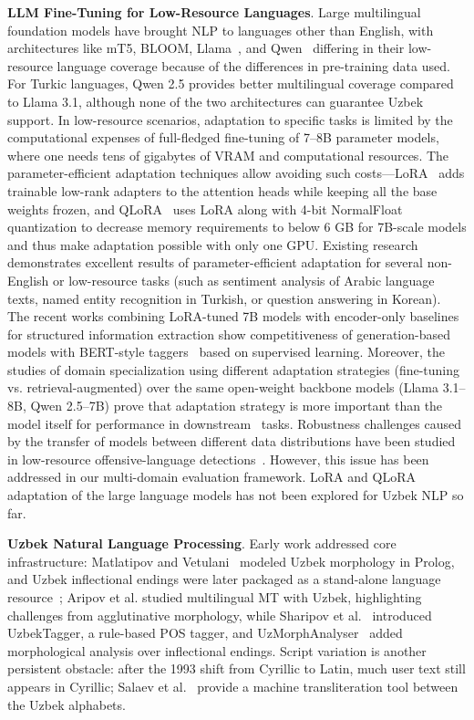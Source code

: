 \documentclass[bdcc,article,submit,moreauthors]{Definitions/mdpi}
\begin{document}
\textbf{LLM Fine-Tuning for Low-Resource Languages}. Large multilingual foundation models have brought NLP to languages other than English, with architectures like mT5, BLOOM, Llama~\cite{Touvron2023-lf,Grattafiori2024-ka}, and Qwen~\cite{Qwen2024-kr} differing in their low-resource language coverage because of the differences in pre-training data used. For Turkic languages, Qwen 2.5 provides better multilingual coverage compared to Llama 3.1, although none of the two architectures can guarantee Uzbek support. In low-resource scenarios, adaptation to specific tasks is limited by the computational expenses of full-fledged fine-tuning of 7–8B parameter models, where one needs tens of gigabytes of VRAM and computational resources. The parameter-efficient adaptation techniques allow avoiding such costs—LoRA~\cite{Hu2021-fz} adds trainable low-rank adapters to the attention heads while keeping all the base weights frozen, and QLoRA~\cite{3666122.3666563} uses LoRA along with 4-bit NormalFloat quantization to decrease memory requirements to below 6 GB for 7B-scale models and thus make adaptation possible with only one GPU. Existing research demonstrates excellent results of parameter-efficient adaptation for several non-English or low-resource tasks (such as sentiment analysis of Arabic language texts, named entity recognition in Turkish, or question answering in Korean). The recent works combining LoRA-tuned 7B models with encoder-only baselines for structured information extraction show competitiveness of generation-based models with BERT-style taggers~\cite{bdcc10060185} based on supervised learning. Moreover, the studies of domain specialization using different adaptation strategies (fine-tuning vs. retrieval-augmented) over the same open-weight backbone models (Llama 3.1–8B, Qwen 2.5–7B) prove that adaptation strategy is more important than the model itself for performance in downstream~\cite{bioengineering12070687} tasks. Robustness challenges caused by the transfer of models between different data distributions have been studied in low-resource offensive-language detections~\cite{bdcc8120170}. However, this issue has been addressed in our multi-domain evaluation framework. LoRA and QLoRA adaptation of the large language models has not been explored for Uzbek NLP so far.


\textbf{Uzbek Natural Language Processing}. Early work addressed core infrastructure: Matlatipov and Vetulani~\cite{Matlatipov2009} modeled Uzbek morphology in Prolog, and Uzbek inflectional endings were later packaged as a stand-alone language resource~\cite{10.1007/978-3-030-63119-2_59}; Aripov et al. \cite{10.1007/978-3-031-05328-3_6} studied multilingual MT with Uzbek, highlighting challenges from agglutinative morphology, while Sharipov et al.~\cite{Sharipov2023-ud} introduced UzbekTagger, a rule-based POS tagger, and UzMorphAnalyser~\cite{Salaev2024} added morphological analysis over inflectional endings. Script variation is another persistent obstacle: after the 1993 shift from Cyrillic to Latin, much user text still appears in Cyrillic; Salaev et al.~\cite{salaev2022translit} provide a machine transliteration tool between the Uzbek alphabets.
\end{document}
